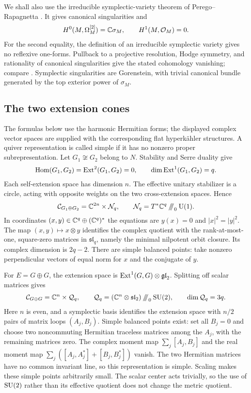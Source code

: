 We shall also use the irreducible symplectic-variety theorem of
Perego--Rapagnetta \cite[Theorem~1.10]{pr23}. It gives canonical
singularities and
\begin{equation}\label{eq:forms-cohomology}
 H^0(M,\Omega_M^{[2]})=\mathbb C\sigma_M,
 \qquad H^1(M,\mathcal O_M)=0.
\end{equation}
For the second equality, the definition of an irreducible
symplectic variety gives no reflexive one-forms. Pullback to
a projective resolution, Hodge symmetry, and rationality of
canonical singularities give the stated cohomology vanishing;
compare \cite[Definition~1.2 and Remark~1.3]{pr23}.
Symplectic singularities are Gorenstein, with trivial canonical
bundle generated by the top exterior power of $\sigma_M$.

\subsection{The two extension cones}\label{subsec:quivers}
The formulas below use the harmonic Hermitian forms; the displayed
complex vector spaces are supplied with the corresponding flat
hyperk\"ahler structures. A quiver representation is called
simple if it has no nonzero proper subrepresentation. Let
$G_1\not\cong G_2$ belong to $N$.
Stability and Serre duality give
\[
 \operatorname{Hom}(G_1,G_2)=\operatorname{Ext}^2(G_1,G_2)=0,
 \qquad \dim\operatorname{Ext}^1(G_1,G_2)=q.
\]
Each self-extension space has dimension $n$. The effective
unitary stabilizer is a circle, acting with opposite weights
on the two cross-extension spaces. Hence
\begin{equation}\label{eq:offdiag-cone}
 \mathcal C_{G_1\oplus G_2}
 =\mathbb C^{2n}\times\mathcal N_q,
 \qquad \mathcal N_q=T^*\mathbb C^q\mathbin{/\!\!/\!\!/}_0\operatorname{U}(1).
\end{equation}
In coordinates $(x,y)\in\mathbb C^q\oplus(\mathbb C^q)^*$ the equations are
$y(x)=0$ and $|x|^2=|y|^2$. The map $(x,y)\mapsto x\otimes y$
identifies the complex quotient with the rank-at-most-one,
square-zero matrices in $\mathfrak{sl}_q$, namely the minimal
nilpotent orbit closure. Its complex dimension is $2q-2$.
There are simple balanced points: take nonzero perpendicular
vectors of equal norm for $x$ and the conjugate of $y$.

For $E=G\oplus G$, the extension space is
$\operatorname{Ext}^1(G,G)\otimes\mathfrak{gl}_2$. Splitting off scalar
matrices gives
\begin{equation}\label{eq:diagonal-cone}
 \mathcal C_{G\oplus G}=\mathbb C^n\times\mathcal Q_q,
 \qquad
 \mathcal Q_q=(\mathbb C^n\otimes\mathfrak{sl}_2)\mathbin{/\!\!/\!\!/}_0\operatorname{SU}(2),
 \qquad \dim\mathcal Q_q=3q.
\end{equation}
Here $n$ is even, and a symplectic basis identifies the extension
space with $n/2$ pairs of matrix loops $(A_j,B_j)$.
Simple balanced points exist: set all $B_j=0$ and choose two
noncommuting Hermitian traceless matrices among the $A_j$, with
the remaining matrices zero. The complex moment map
$\sum_j[A_j,B_j]$ and the real moment map
$\sum_j([A_j,A_j^*]+[B_j,B_j^*])$ vanish. The two Hermitian
matrices have no common invariant line, so this representation
is simple. Scaling makes these simple points arbitrarily small.
The scalar center acts trivially, so the use of $\operatorname{SU}(2)$ rather
than its effective quotient does not change the metric quotient.

